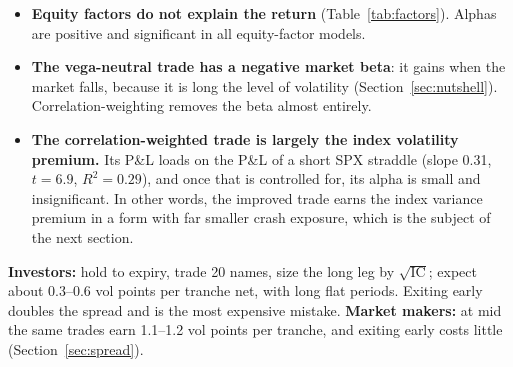 \begin{table}[t]
  \centering
  \small
  \caption{Factor regressions of net tranche P\&L (vol points). Newey--West $t$-statistics with two lags.}
  \label{tab:factors}
\end{table}

\begin{itemize}
  \item \textbf{Equity factors do not explain the return} (Table~\ref{tab:factors}). Alphas are positive and significant in all equity-factor models.
  \item \textbf{The vega-neutral trade has a negative market beta}: it gains when the market falls, because it is long the level of volatility (Section~\ref{sec:nutshell}). Correlation-weighting removes the beta almost entirely.
  \item \textbf{The correlation-weighted trade is largely the index volatility premium.} Its P\&L loads on the P\&L of a short SPX straddle (slope 0.31, $t = 6.9$, $R^2 = 0.29$), and once that is controlled for, its alpha is small and insignificant. In other words, the improved trade earns the index variance premium \citep{CarrWu2009} in a form with far smaller crash exposure, which is the subject of the next section.
\end{itemize}

\begin{desk}
\textbf{Investors:} hold to expiry, trade 20 names, size the long leg by $\sqrt{\text{IC}}$; expect about 0.3--0.6 vol points per tranche net, with long flat periods. Exiting early doubles the spread and is the most expensive mistake. \textbf{Market makers:} at mid the same trades earn 1.1--1.2 vol points per tranche, and exiting early costs little (Section~\ref{sec:spread}).
\end{desk}

